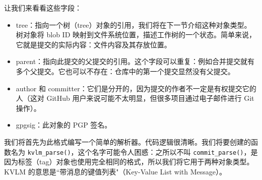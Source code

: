 \documentclass{ctexart}
\theoremstyle{remark}
\theoremstyle{warningstyle}
\theoremstyle{warningstyle}
\begin{document}
让我们来看看这些字段：
\begin{itemize}
    \item tree：指向一个树（tree）对象的引用，我们将在下一节介绍这种对象类型。树对象将 blob ID 映射到文件系统位置，描述工作树的一个状态。简单来说，它就是提交的实际内容：文件内容及其存放位置。
    \item parent：指向此提交的父提交的引用。这个字段可以重复：例如合并提交就有多个父提交。它也可以不存在：仓库中的第一个提交显然没有父提交。
    \item author 和 committer：它们是分开的，因为提交的作者不一定是有权提交它的人（这对 GitHub 用户来说可能不太明显，但很多项目通过电子邮件进行 Git 操作）。
    \item gpgsig：此对象的 PGP 签名。
\end{itemize}
我们将首先为此格式编写一个简单的解析器。代码逻辑很清晰。我们将要创建的函数名为 \lstinline|kvlm_parse()|，这个名字可能令人困惑：之所以不叫 \lstinline|commit_parse()|，是因为标签（tag）对象也使用完全相同的格式，所以我们将它用于两种对象类型。KVLM 的意思是``带消息的键值列表"（Key-Value List with Message）。
\end{document}

